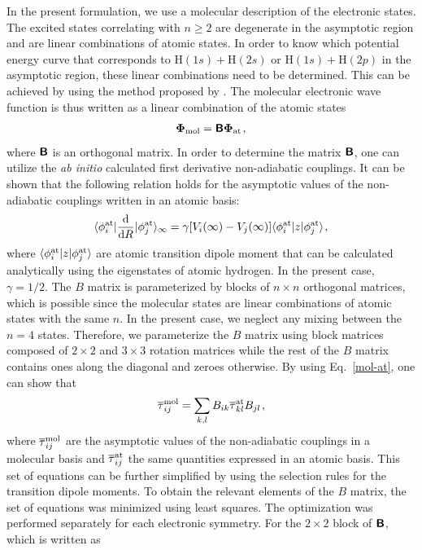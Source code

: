 \documentclass[fleqn,usenatbib]{mnras}
\DeclarePairedDelimiter\bra{\langle}{\rvert}
\DeclarePairedDelimiter\ket{\lvert}{\rangle}
\begin{document}
In the present formulation, we use a molecular description of the electronic states. The excited states correlating with $n\geq 2$ are degenerate in the asymptotic region and are linear combinations of atomic states. In order to know which potential energy curve that corresponds to $\mathrm{H}(1s)+\mathrm{H}(2s)$ or $\mathrm{H}(1s)+\mathrm{H}(2p)$ in the asymptotic region, these linear combinations need to be determined. This can be achieved by using the method proposed by \cite{belyaev2015}. The molecular electronic wave function is thus written as a linear combination of the atomic states
\begin{align}
\mathbf{\Phi}_{\rm mol} = \textbf{\textsf{B}} \mathbf{\Phi}_{\rm at} \hspace{1 pt},\label{mol-at}
\end{align}
where $\textbf{\textsf{B}}$ is an orthogonal matrix. In order to determine the matrix $\textbf{\textsf{B}}$, one can utilize the \textit{ab initio} calculated first derivative non-adiabatic couplings. It can be shown \citep[see e.g.][]{grosser1999,belyaev2001} that the following relation holds for the asymptotic values of the non-adiabatic couplings written in an atomic basis:
\begin{align}
\bra{\phi^{\rm at}_i}\dfrac{\textrm{d}}{\textrm{d}R}\ket{\phi^{\rm at}_j}_\infty = \gamma[V_i(\infty) - V_j(\infty)]\bra{\phi^{\rm at}_i}z\ket{\phi^{\rm at}_j} \hspace{1 pt},\label{atomcouplings}
\end{align}
where $\bra{\phi^{\rm at}_i}z\ket{\phi^{\rm at}_j}$ are atomic transition dipole moment that can be calculated analytically using the eigenstates of atomic hydrogen. In the present case, $\gamma = 1/2$. The $B$ matrix is parameterized by blocks of $n\times n$ orthogonal matrices, which is possible since the molecular states are linear combinations of atomic states with the same $n$. In the present case, we neglect any mixing between the $n=4$ states. Therefore, we parameterize the $B$ matrix using block matrices composed of $2\times2$ and $3\times3$ rotation matrices while the rest of the $B$ matrix contains ones along the diagonal and zeroes otherwise. By using Eq.~\eqref{mol-at}, one can show that
\begin{align}
\overline{\tau}^{\rm mol}_{ij} = \sum_{k,l} B_{ik}\overline{\tau}^{\rm at}_{kl}B_{jl} \hspace{1 pt},
\end{align}
where $\overline{\tau}^{\rm mol}_{ij}$ are the asymptotic values of the non-adiabatic couplings in a molecular basis and $\overline{\tau}^{\rm at}_{ij}$ the same quantities expressed in an atomic basis. This set of equations can be further simplified by using the selection rules for the transition dipole moments. To obtain the relevant elements of the $B$ matrix, the set of equations was minimized using least squares. The optimization was performed separately for each electronic symmetry. For the $2\times 2$ block of $\textbf{\textsf{B}}$, which is written as
\end{document}
